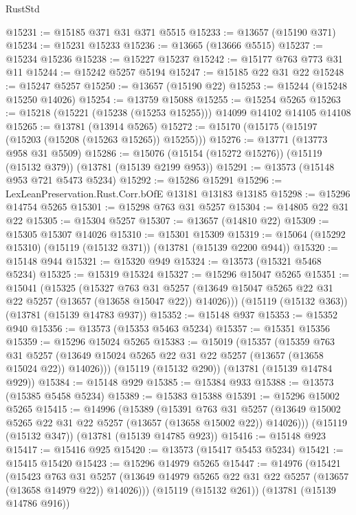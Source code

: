 \begin{lexlean}{RustStd}
\begin{coremodule}
@15231 := @15185 @371 @31 @371 @5515
@15233 := @13657 (@15190 @371)
@15234 := @15231 @15233
@15236 := @13665 (@13666 @5515)
@15237 := @15234 @15236
@15238 := @15227 @15237
@15242 := @15177 @763 @773 @31 @11
@15244 := @15242 @5257 @5194
@15247 := @15185 @22 @31 @22
@15248 := @15247 @5257
@15250 := @13657 (@15190 @22)
@15253 := @15244 (@15248 @15250 @14026)
@15254 := @13759 @15088
@15255 := @15254 @5265
@15263 := @15218 (@15221 (@15238 (@15253 @15255))) @14099 @14102 @14105 @14108
@15265 := @13781 (@13914 @5265)
@15272 := @15170 (@15175 (@15197 (@15203 (@15208 (@15263 @15265)) @15255)))
@15276 := @13771 (@13773 @958 @31 @5509)
@15286 := @15076 (@15154 (@15272 @15276)) (@15119 (@15132 @379)) (@13781 (@15139 @2199 @953))
@15291 := @13573 (@15148 @953 @721 @5473 @5234)
@15292 := @15286 @15291
@15296 := LexLeanPreservation.Rust.Corr.bOfE @13181 @13183 @13185
@15298 := @15296 @14754 @5265
@15301 := @15298 @763 @31 @5257
@15304 := @14805 @22 @31 @22
@15305 := @15304 @5257
@15307 := @13657 (@14810 @22)
@15309 := @15305 @15307 @14026
@15310 := @15301 @15309
@15319 := @15064 (@15292 @15310) (@15119 (@15132 @371)) (@13781 (@15139 @2200 @944))
@15320 := @15148 @944
@15321 := @15320 @949
@15324 := @13573 (@15321 @5468 @5234)
@15325 := @15319 @15324
@15327 := @15296 @15047 @5265
@15351 := @15041
    (@15325
      (@15327
        @763
        @31
        @5257
        (@13649 @15047 @5265 @22 @31 @22 @5257 (@13657 (@13658 @15047 @22)) @14026)))
    (@15119 (@15132 @363))
    (@13781 (@15139 @14783 @937))
@15352 := @15148 @937
@15353 := @15352 @940
@15356 := @13573 (@15353 @5463 @5234)
@15357 := @15351 @15356
@15359 := @15296 @15024 @5265
@15383 := @15019
    (@15357
      (@15359
        @763
        @31
        @5257
        (@13649 @15024 @5265 @22 @31 @22 @5257 (@13657 (@13658 @15024 @22)) @14026)))
    (@15119 (@15132 @290))
    (@13781 (@15139 @14784 @929))
@15384 := @15148 @929
@15385 := @15384 @933
@15388 := @13573 (@15385 @5458 @5234)
@15389 := @15383 @15388
@15391 := @15296 @15002 @5265
@15415 := @14996
    (@15389
      (@15391
        @763
        @31
        @5257
        (@13649 @15002 @5265 @22 @31 @22 @5257 (@13657 (@13658 @15002 @22)) @14026)))
    (@15119 (@15132 @347))
    (@13781 (@15139 @14785 @923))
@15416 := @15148 @923
@15417 := @15416 @925
@15420 := @13573 (@15417 @5453 @5234)
@15421 := @15415 @15420
@15423 := @15296 @14979 @5265
@15447 := @14976
    (@15421
      (@15423
        @763
        @31
        @5257
        (@13649 @14979 @5265 @22 @31 @22 @5257 (@13657 (@13658 @14979 @22)) @14026)))
    (@15119 (@15132 @261))
    (@13781 (@15139 @14786 @916))

\end{coremodule}
\end{lexlean}
